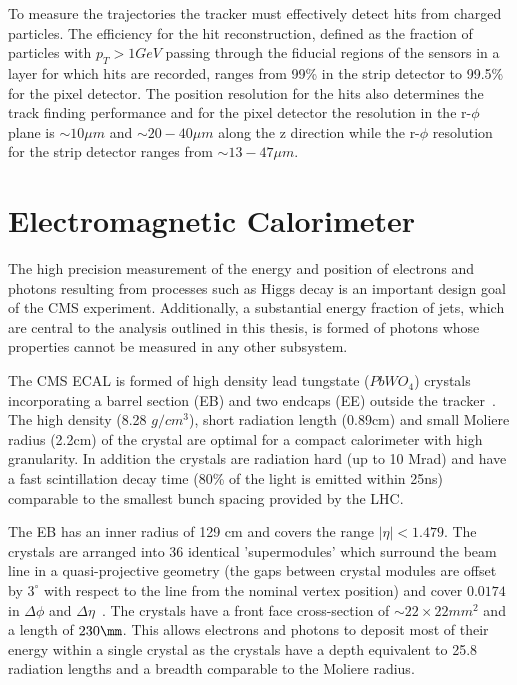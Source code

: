 To measure the trajectories the tracker must effectively detect hits from charged particles. The efficiency for the 
hit reconstruction, defined as the fraction of particles with $p_T > 1 GeV$ passing through the fiducial regions of the sensors
in a layer for which hits are recorded, ranges from 99\% in the strip detector to 99.5\% for the pixel detector.
The position resolution for the hits also determines the track finding performance and for 
the pixel detector the resolution in the r-$\phi$ plane is $\sim10\mu m$ and $\sim20-40\mu m$ along
the z direction while the r-$\phi$ resolution for the strip detector ranges from $\sim13-47\mu m$.

\section{Electromagnetic Calorimeter}

The high precision measurement of the energy and position of electrons and photons resulting from 
processes such as Higgs decay is an important design goal of the CMS experiment. Additionally,
a substantial energy fraction of jets, which are central to the analysis outlined in this
thesis, is formed of photons whose properties cannot be measured in any other subsystem.

The CMS ECAL is formed of high density lead tungstate ($PbWO_4$) crystals incorporating a barrel section (EB) 
and two endcaps (EE) outside the tracker~\cite{ecal_tdr}. The high density (8.28 $g/cm^3$), short radiation length (0.89cm) 
and small Moliere radius (2.2cm) of the crystal are optimal for a compact calorimeter with high granularity. In addition the 
crystals are radiation hard (up to 10 Mrad) and have a fast scintillation decay time (80\% of the light is emitted within 25ns)
comparable to the smallest bunch spacing provided by the LHC. 

The EB has an inner radius of 129 cm and covers the range $|\eta| < 1.479$. The crystals are arranged into 36 
identical 'supermodules' which surround the beam line in a quasi-projective geometry (the gaps between
crystal modules are offset by $3^\circ$ with respect to the line from the nominal vertex position)
and cover $0.0174$ in $\Delta\phi$ and $\Delta\eta$~\cite{CMS}. The crystals have a front face cross-section 
of $\sim 22\times22mm^2$ and a length of $230\mm$. This allows electrons and photons to deposit most of their  
energy within a single crystal as the crystals have a depth equivalent to 25.8 radiation lengths and 
a breadth comparable to the Moliere radius. 

